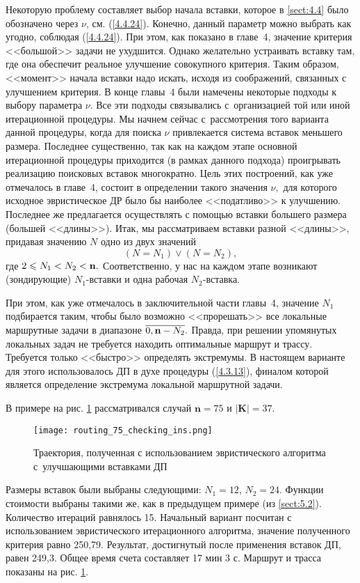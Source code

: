 Некоторую проблему составляет выбор начала вставки,
которое в \ref{sect:4.4}
было обозначено через $\nu$,
см. (\ref{4.4.24}).
Конечно, данный параметр можно выбрать как угодно,
соблюдая (\ref{4.4.24}).
При этом, как показано в
главе~4, значение критерия <<большой>> задачи не ухудшится.
Однако желательно устраивать вставку там,
где она обеспечит реальное улучшение совокупного критерия.
Таким образом, <<момент>> начала вставки надо искать,
исходя из соображений, связанных с улучшением критерия.
В конце главы~4 были намечены некоторые подходы к выбору параметра $\nu.$
Все эти подходы связывались с~организацией той или иной итерационной процедуры.
Мы начнем сейчас с~рассмотрения того варианта данной процедуры,
когда для поиска $\nu$
привлекается система вставок меньшего размера.
Последнее существенно,
так как на каждом этапе основной итерационной процедуры приходится
(в рамках данного подхода)
проигрывать реализацию поисковых вставок многократно.
Цель этих построений, как  уже отмечалось в главе~4,
состоит в определении такого значения $\nu,$
для которого исходное эвристическое ДР было бы
наиболее <<податливо>> к улучшению.
Последнее же предлагается осуществлять с помощью вставки большего размера
(большей <<длины>>).
Итак, мы рассматриваем вставки разной <<длины>>,
придавая значению $N$ одно из двух значений
$$
  (N = N_1) \vee (N=N_2)
  ,
$$
где $2 \leqslant N_1 < N_2 <{\mathbf n}.$
Соответственно, у нас на каждом этапе возникают
(зондирующие)
$N_1$-вставки и одна рабочая $N_2$-вставка.

При этом, как уже отмечалось в заключительной части главы~4,
значение
$N_1$ подбирается таким,
чтобы было возможно <<прорешать>> все локальные маршрутные задачи в диапазоне
$\ov{0,\nn-N_2}.$
Правда, при решении упомянутых
локальных задач не требуется находить оптимальные маршрут и трассу.
Требуется только <<быстро>> определять экстремумы.
В настоящем варианте для этого использовалось ДП в духе процедуры (\ref{4.3.13}),
финалом которой является определение экстремума локальной маршрутной задачи.

В примере
на рис. \ref{DP_Inserts_Result}
рассматривался случай
$\mathbf{n}=75$ и $|\mathbf{K}|=37$.

\begin{figure}[H]
  \centering
  \texttt{[image: routing\_75\_checking\_ins.png]}
  \caption{
    Траектория, полученная с использованием эвристического алгоритма
    с~улучшающими вставками ДП
    }
  \label{DP_Inserts_Result}
\end{figure}

Размеры вставок были выбраны следующими:
$N_1=12$, $N_2=24$.
Функции стоимости выбраны такими же, как в предыдущем примере
(из \ref{sect:5.2}).
Количество итераций равнялось 15.
Начальный вариант посчитан с использованием эвристического итерационного алгоритма,
значение полученного критерия равно 250,79.
Результат, достигнутый после применения вставок ДП, равен 249,3.
Общее время счета составляет 17 мин 3 с.
Маршрут и трасса показаны
на рис. \ref{DP_Inserts_Result}.
